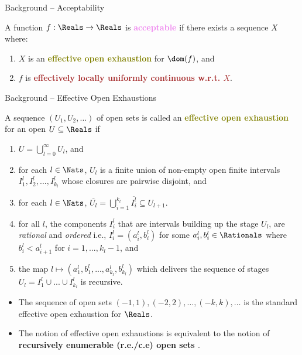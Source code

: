 
\begin{frame}{Background -- Acceptability}
    \begin{definition}[\textbf{\textcolor{violet}{Acceptability}}]
        A function $f:\Reals\to\Reals$ is \textbf{\textcolor{violet}{acceptable}} if there exists a sequence $X$ where:
        \begin{enumerate}
            \pause\item $X$ is an  \textbf{\textcolor{olive}{effective open exhaustion}} for $\dom(f)$, and
            \pause\item $f$ is  \textbf{\textcolor{brown}{effectively locally uniformly continuous w.r.t.\null{} $X$}}.
        \end{enumerate}
    \end{definition}
\end{frame}
\begin{frame}{Background -- Effective Open Exhaustions}
\vspace{-1em}
\pause
\begin{definition}
        \pause A sequence $(U_1, U_2, \ldots)$ of open sets is called an \textbf{\textcolor{olive}{effective open exhaustion}} for an open $U\subseteq \Reals$ if 
        \pause \begin{enumerate}
                \item $ U = \bigcup_{l=0}^\infty U_l$, and
                \pause\item for each $l \in \Nats$,
                  $U_l$ \pause is a finite union of non-empty open finite intervals $I_1^l, I_2^l,...,I_{k_l}^l $ whose closures are pairwise disjoint, and
                \pause\item for each $l \in \Nats$,
                   $\overline{U_l} = \bigcup_{i=1}^{k_l} \overline{I_i^l} \subseteq U_{l+1}$.
                \pause\item 
                for all $l$, the components $I_i^l$ that are intervals building up the stage $U_l$, are \textit{rational} \pause and \textit{ordered} i.e., $I_i^l = (a_i^l, b_i^l)$ for some $a_i^l, b_i^l \in \Rationals$ where $b_i^l < a_{i+1}^l$ for $i=1,...,k_l-1$, and
                \pause\item the map
                $l\mapsto ( a_1^l , b_1^l, ...,
                 a_{k_l}^l, b_{k_l}^l)$
                which delivers the sequence of stages $U_l = I_1^l\cup ...\cup I_{k_l}^l$ is recursive.
        \end{enumerate}
    \end{definition}
    \pause
    \begin{itemize}
        \item 
        The sequence of open sets $(-1, 1), (-2, 2), \ldots, (-k, k), \ldots$
        is the standard effective open exhaustion for $\Reals$.
        \pause\item 
        The notion of effective open exhaustions is equivalent to the notion of \textbf{\textcolor{Sepia}{recursively enumerable (r.e./c.e) open sets \citep{Weihrauch2000}}}.
    \end{itemize}
   
\end{frame}
